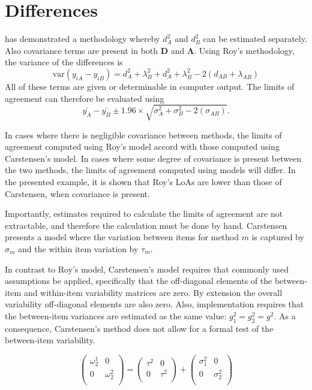 \documentclass[12pt, a4paper]{report}
\theoremstyle{plain}
\theoremstyle{definition}
\theoremstyle{remark}
\begin{document}
\section{Differences}
\citet{ARoy2009} has demonstrated a methodology whereby $d^2_{A}$ and $d^2_{B}$ can be estimated separately. Also covariance terms are present in both $\boldsymbol{D}$ and $\boldsymbol{\Lambda}$. Using Roy's methodology, the variance of the differences is
\begin{equation}
\mbox{var} (y_{iA}-y_{iB})= d^2_{A} + \lambda^2_{B} + d^2_{A} + \lambda^2_{B} - 2(d_{AB} + \lambda_{AB})
\end{equation}
All of these terms are given or determinable in computer output.
The limits of agreement can therefore be evaluated using
\begin{equation}
\bar{y_{A}}-\bar{y_{B}} \pm 1.96 \times \sqrt{ \sigma^2_{A} + \sigma^2_{B}  - 2(\sigma_{AB})}.
\end{equation}




In cases where there is negligible covariance between methods, the limits of agreement computed using Roy's model accord with those computed using Carstensen's model. In cases where some degree of
covariance is present between the two methods, the limits of agreement computed using models will differ. In the presented
example, it is shown that Roy's LoAs are lower than those of Carstensen, when covariance is present.

Importantly, estimates required to calculate the limits of agreement are not extractable, and therefore the calculation must
be done by hand.
Carstensen presents a model where the variation between items for
method $m$ is captured by $\sigma_m$ and the within item variation
by $\tau_m$.



In contrast to Roy's model, Carstensen's model requires that commonly used assumptions be applied, specifically that the off-diagonal elements of the between-item and within-item variability matrices are zero. By
extension the overall variability off-diagonal elements are also zero. Also, implementation requires that the between-item variances are estimated as the same value: $g^2_1 = g^2_2 = g^2$.
As a consequence, Carstensen's method does not allow for a formal test of the between-item variability.

\[\left(\begin{array}{cc}
\omega^1_2  & 0 \\
0 & \omega^2_2 \\
\end{array}  \right)
=  \left(
\begin{array}{cc}
\tau^2  & 0 \\
0 & \tau^2 \\
\end{array} \right)+
\left(
\begin{array}{cc}
\sigma^2_1  & 0 \\
0 & \sigma^2_2 \\
\end{array}\right)
\]
\end{document}
